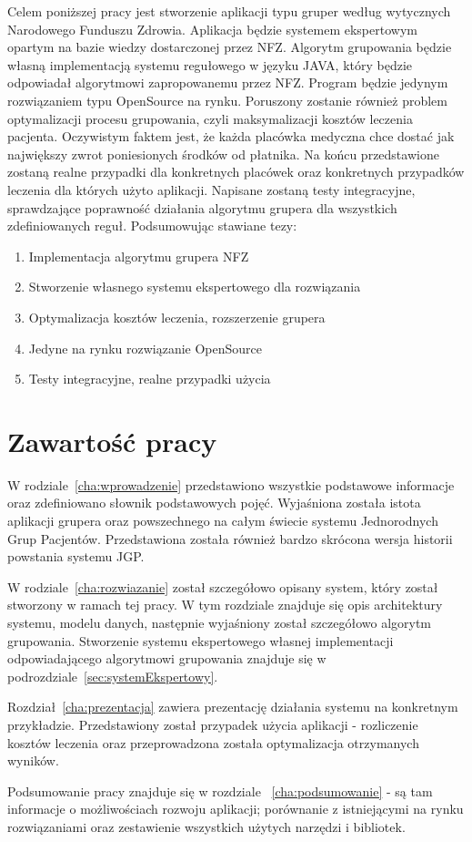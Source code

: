 Celem poniższej pracy jest stworzenie aplikacji typu gruper według wytycznych Narodowego Funduszu Zdrowia. Aplikacja będzie systemem ekspertowym opartym na bazie wiedzy dostarczonej przez NFZ. Algorytm grupowania będzie własną implementacją systemu regułowego w języku JAVA, który będzie odpowiadał algorytmowi zapropowanemu przez NFZ. Program będzie jedynym rozwiązaniem typu OpenSource na rynku. Poruszony zostanie również problem optymalizacji procesu grupowania, czyli maksymalizacji kosztów leczenia pacjenta. Oczywistym faktem jest, że każda placówka medyczna chce dostać jak największy zwrot poniesionych środków od płatnika. Na końcu przedstawione zostaną realne przypadki dla konkretnych placówek oraz konkretnych przypadków leczenia dla których użyto aplikacji. Napisane zostaną testy integracyjne, sprawdzające poprawność działania algorytmu grupera dla wszystkich zdefiniowanych reguł. 
Podsumowując stawiane tezy:
\begin{enumerate}
\item Implementacja algorytmu grupera NFZ
\item Stworzenie własnego systemu ekspertowego dla rozwiązania
\item Optymalizacja kosztów leczenia, rozszerzenie grupera
\item Jedyne na rynku rozwiązanie OpenSource
\item Testy integracyjne, realne przypadki użycia
\end{enumerate}



\section{Zawartość pracy}
\label{sec:zawartoscPracy}

W rodziale~\ref{cha:wprowadzenie} przedstawiono wszystkie podstawowe informacje oraz zdefiniowano słownik podstawowych pojęć. Wyjaśniona została istota aplikacji grupera oraz powszechnego na całym świecie systemu Jednorodnych Grup Pacjentów. Przedstawiona została również bardzo skrócona wersja historii powstania systemu JGP.

W rodziale~\ref{cha:rozwiazanie} został szczegółowo opisany system, który został stworzony w ramach tej pracy. W tym rozdziale znajduje się opis architektury systemu, modelu danych, następnie wyjaśniony został szczegółowo algorytm grupowania. Stworzenie systemu ekspertowego własnej implementacji odpowiadającego algorytmowi grupowania znajduje się w podrozdziale~\ref{sec:systemEkspertowy}.

Rozdział~\ref{cha:prezentacja} zawiera prezentację działania systemu na konkretnym przykładzie. Przedstawiony został przypadek użycia aplikacji - rozliczenie kosztów leczenia oraz przeprowadzona została optymalizacja otrzymanych wyników.

Podsumowanie pracy znajduje się w rozdziale ~\ref{cha:podsumowanie} - są tam informacje o możliwościach rozwoju aplikacji; porównanie z istniejącymi na rynku rozwiązaniami oraz zestawienie wszystkich użytych narzędzi i bibliotek.

